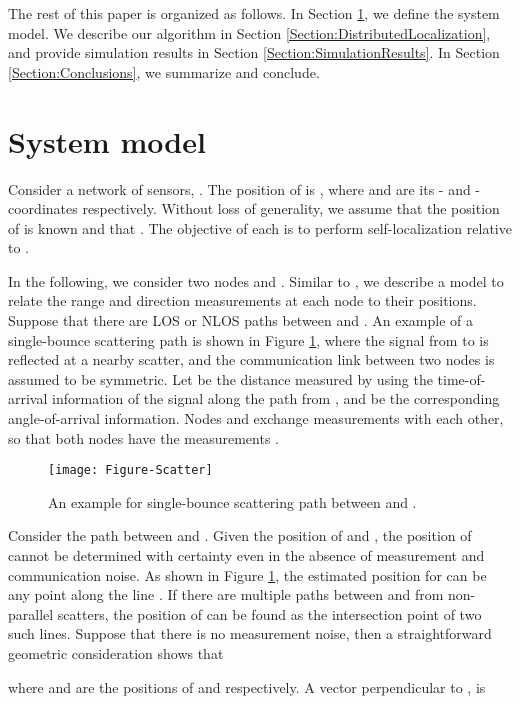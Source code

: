 \documentclass[10pt, twocolumn, final]{IEEEtran}
\begin{document}
The rest of this paper is organized as follows. In Section \ref{Section:System}, we define the system model. We describe our algorithm in Section \ref{Section:DistributedLocalization}, and provide simulation results in Section \ref{Section:SimulationResults}. In Section \ref{Section:Conclusions}, we summarize and conclude.

\section{System model}\label{Section:System}
Consider a network of  sensors, . The position of  is , where  and  are its - and -coordinates respectively. Without loss of generality, we assume that the position of  is known and that . The objective of each  is to perform self-localization relative to .

In the following, we consider two nodes  and . Similar to \cite{Seow2008}, we describe a model to relate the range and direction measurements at each node to their positions. Suppose that there are  LOS or NLOS paths between  and . An example of a single-bounce scattering path is shown in Figure \ref{Figure-Scatter}, where the signal from  to  is reflected at a nearby scatter, and the communication link between two nodes is assumed to be symmetric. Let  be the distance measured by  using the time-of-arrival information of the signal along the  path from , and  be the corresponding angle-of-arrival information. Nodes  and  exchange measurements with each other, so that both nodes have the measurements .

\begin{figure}[!t]
\centering
\texttt{[image: Figure-Scatter]}
\caption{An example for single-bounce scattering path between  and .} \label{Figure-Scatter}
\end{figure}

Consider the  path between  and . Given the position of  and , the position of  cannot be determined with certainty even in the absence of measurement and communication noise. As shown in Figure \ref{Figure-Scatter}, the estimated position for  can be any point along the line . If there are multiple paths between  and  from non-parallel scatters, the position of  can be found as the intersection point of two such lines. Suppose that there is no measurement noise, then a straightforward geometric consideration shows that

where  and  are the positions of  and  respectively. A vector perpendicular to , is
\end{document}
